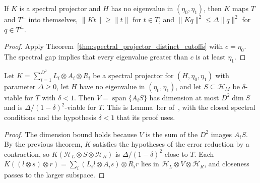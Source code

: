 \begin{theorem}
    \label{thm:spectral_projector_contract}
    \leanok
    If $K$ is a spectral projector and $H$ has no eigenvalue in
    $(\eta_0,\eta_1)$, then $K$ maps $T$ and $T^\perp$ into themselves,
    $\lVert Kt\rVert\ge\lVert t\rVert$ for $t\in T$, and
    $\lVert Kq\rVert^2\le\Delta\lVert q\rVert^2$ for $q\in T^\perp$.
\end{theorem}

\begin{proof}
    \leanok
    Apply Theorem~\ref{thm:spectral_projector_distinct_cutoffs} with
    $c=\eta_0$. The spectral gap implies that every eigenvalue greater
    than $c$ is at least $\eta_1$.
\end{proof}

\begin{theorem}
    \label{thm:viable_spectral_projector}
    \leanok
    Let $K=\sum_{i=1}^{D^2}L_i\otimes A_i\otimes R_i$ be a spectral
    projector for $(H,\eta_0,\eta_1)$ with parameter $\Delta\ge0$, let $H$
    have no eigenvalue in $(\eta_0,\eta_1)$, and let $S\subseteq\mathcal H_M$
    be $\delta$-viable for $T$ with $\delta<1$. Then
    $V=\operatorname{span}\{A_iS\}$ has dimension at most $D^2\dim S$ and
    is $\Delta/(1-\delta)^2$-viable for $T$. This is Lemma~l:er
    of~\cite[lines 597--622]{Arad2016RigorousRG}, with the closed spectral
    conditions and the hypothesis $\delta<1$ that its proof uses.
\end{theorem}

\begin{proof}
    \leanok
    The dimension bound holds because $V$ is the sum of the $D^2$ images
    $A_iS$. By the previous theorem, $K$ satisfies the hypotheses of the
    error reduction by a contraction, so
    $K(\mathcal H_L\otimes S\otimes\mathcal H_R)$ is
    $\Delta/(1-\delta)^2$-close to $T$. Each
    $K((l\otimes s)\otimes r)=\sum_i(L_il\otimes A_is)\otimes R_ir$ lies in
    $\mathcal H_L\otimes V\otimes\mathcal H_R$, and closeness passes to the
    larger subspace.
\end{proof}

